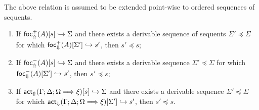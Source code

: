 The above relation is assumed to be extended point-wise to ordered sequences of
sequents.

\begin{lemma}\label{fdercompllemma}
  \begin{enumerate}
  \item If $\textsf{foc}^+_{\Uparrow}(A) [s] \hookrightarrow \Sigma$ and there exists a derivable sequence of
    sequents $\Sigma' \preceq \Sigma$ for which $\textsf{foc}^+_{\Downarrow}(A) [\Sigma'] \hookrightarrow s'$, then
    $s' \preceq s$;
  \item If $\textsf{foc}^-_{\Uparrow}(A) [s] \hookrightarrow \Sigma$ and there exists a derivable sequence
    $\Sigma' \preceq \Sigma$ for which $\textsf{foc}^-_{\Downarrow}(A) [\Sigma'] \hookrightarrow s'$, then $s'
    \preceq s$;
  \item If $\textsf{act}_{\Uparrow}(\Gamma; \Delta; \Omega \Longrightarrow \xi) [s] \hookrightarrow \Sigma$ and
    there exists a derivable sequence $\Sigma' \preceq \Sigma$ for which
    $\textsf{act}_{\Downarrow}(\Gamma; \Delta; \Omega \Longrightarrow \xi) [\Sigma'] \hookrightarrow s'$, then
    $s' \preceq s$.
  \end{enumerate}
\end{lemma}
